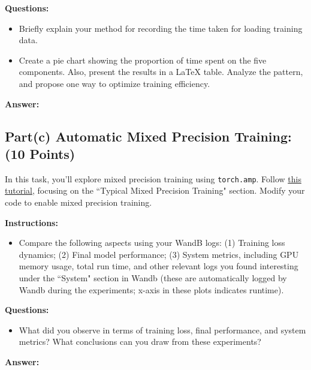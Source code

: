 \documentclass[11pt, oneside]{article}   	%
\begin{document}
\textbf{Questions:}
\begin{itemize}
    \item Briefly explain your method for recording the time taken for loading training data.
    \item Create a pie chart showing the proportion of time spent on the five components. Also, present the results in a LaTeX table. Analyze the pattern, and propose one way to optimize training efficiency.
\end{itemize}

\textbf{Answer:}


\subsection*{Part(c) Automatic Mixed Precision Training: (10 Points)}
In this task, you’ll explore mixed precision training using \texttt{torch.amp}. Follow \href{https://pytorch.org/docs/stable/notes/amp_examples.html}{this tutorial}, focusing on the ``Typical Mixed Precision Training" section. Modify your code to enable mixed precision training.

\textbf{Instructions:}
\begin{itemize}
    \item Compare the following aspects using your WandB logs: (1) Training loss dynamics; (2) Final model performance; (3) System metrics, including GPU memory usage, total run time, and other relevant logs you found interesting under the ``System" section in Wandb (these are automatically logged by Wandb during the experiments; x-axis in these plots indicates runtime).
\end{itemize}

\textbf{Questions:}
\begin{itemize}
    \item What did you observe in terms of training loss, final performance, and system metrics? What conclusions can you draw from these experiments?
\end{itemize}

\textbf{Answer:}
\end{document}
